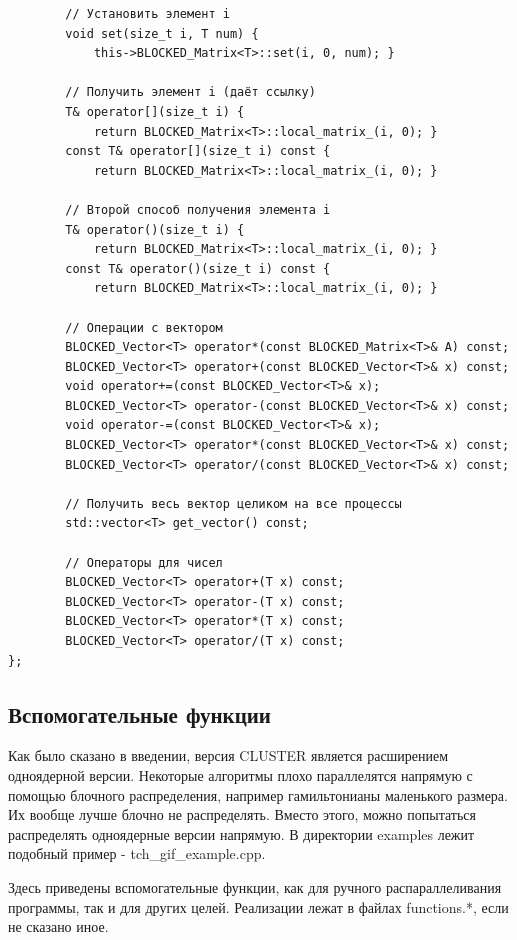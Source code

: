 \documentclass[12pt,fleqn]{article}
\begin{document}
\begin{mdframed}[linecolor=black, topline=true, bottomline=true,
    leftline=false, rightline=false]
\begin{verbatim}
        // Установить элемент i
        void set(size_t i, T num) { 
            this->BLOCKED_Matrix<T>::set(i, 0, num); }

        // Получить элемент i (даёт ссылку)
        T& operator[](size_t i) { 
            return BLOCKED_Matrix<T>::local_matrix_(i, 0); }
        const T& operator[](size_t i) const { 
            return BLOCKED_Matrix<T>::local_matrix_(i, 0); }

        // Второй способ получения элемента i
        T& operator()(size_t i) { 
            return BLOCKED_Matrix<T>::local_matrix_(i, 0); }
        const T& operator()(size_t i) const { 
            return BLOCKED_Matrix<T>::local_matrix_(i, 0); }

        // Операции с вектором
        BLOCKED_Vector<T> operator*(const BLOCKED_Matrix<T>& A) const;
        BLOCKED_Vector<T> operator+(const BLOCKED_Vector<T>& x) const;
        void operator+=(const BLOCKED_Vector<T>& x);
        BLOCKED_Vector<T> operator-(const BLOCKED_Vector<T>& x) const;
        void operator-=(const BLOCKED_Vector<T>& x);
        BLOCKED_Vector<T> operator*(const BLOCKED_Vector<T>& x) const;
        BLOCKED_Vector<T> operator/(const BLOCKED_Vector<T>& x) const;

        // Получить весь вектор целиком на все процессы
        std::vector<T> get_vector() const;

        // Операторы для чисел
        BLOCKED_Vector<T> operator+(T x) const;
        BLOCKED_Vector<T> operator-(T x) const;
        BLOCKED_Vector<T> operator*(T x) const;
        BLOCKED_Vector<T> operator/(T x) const;
};
\end{verbatim}
\end{mdframed}
        \subsection{Вспомогательные функции}
        Как было сказано в введении, версия \textsf{CLUSTER} является расширением одноядерной версии. Некоторые алгоритмы плохо параллелятся напрямую с помощью блочного распределения, 
        например гамильтонианы маленького размера. Их вообще лучше блочно не распределять. Вместо этого, можно попытаться распределять одноядерные версии напрямую. В директории 
        examples лежит подобный пример - \textsf{tch\_gif\_example.cpp}.

        Здесь приведены вспомогательные функции, как для ручного распараллеливания программы, так и для других целей. Реализации лежат в файлах \textsf{functions.*}, если не сказано иное.
\end{document}
